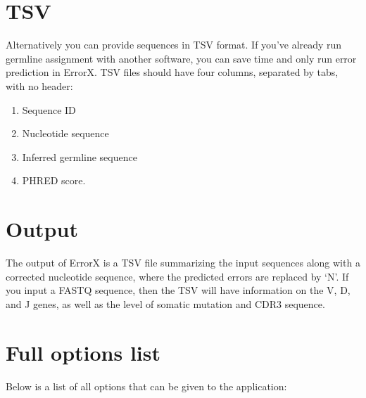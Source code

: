 \documentclass[letterpaper,10pt,english]{sphinxmanual}
\begin{document}
\section{TSV}
\label{\detokenize{index:tsv}}
Alternatively you can provide sequences in TSV format. If you’ve already run germline assignment with another software, you can save time and only run error prediction in ErrorX. TSV files should have four columns, separated by tabs, with no header:
\begin{enumerate}
\def\theenumi{\arabic{enumi}}
\def\labelenumi{\theenumi .}
\makeatletter\def\p@enumii{\p@enumi \theenumi .}\makeatother
\item {} 
Sequence ID

\item {} 
Nucleotide sequence

\item {} 
Inferred germline sequence

\item {} 
PHRED score.

\end{enumerate}


\section{Output}
\label{\detokenize{index:output}}
The output of ErrorX is a TSV file summarizing the input sequences along with a corrected nucleotide sequence, where the predicted errors are replaced by ‘N’. If you input a FASTQ sequence, then the TSV will have information on the V, D, and J genes, as well as the level of somatic mutation and CDR3 sequence.


\section{Full options list}
\label{\detokenize{index:full-options-list}}
Below is a list of all options that can be given to the application:
\end{document}
